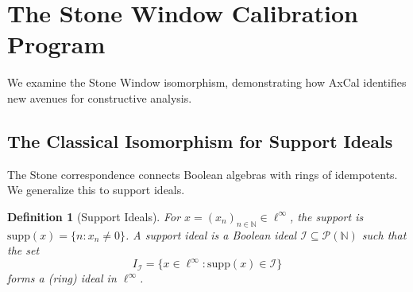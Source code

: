 \documentclass[11pt]{article}
\newtheorem{definition}[theorem]{Definition}
\newcommand{\N}{\mathbb{N}}
\newcommand{\linf}{\ell^\infty}
\newcommand{\supp}{\mathrm{supp}}
\begin{document}
\section{The Stone Window Calibration Program}

We examine the Stone Window isomorphism, demonstrating how AxCal identifies new avenues for constructive analysis.

\subsection{The Classical Isomorphism for Support Ideals}

The Stone correspondence connects Boolean algebras with rings of idempotents. We generalize this to support ideals.

\begin{definition}[Support Ideals]
For $x = (x_n)_{n \in \N} \in \linf$, the \emph{support} is $\supp(x) = \{n : x_n \neq 0\}$. A \emph{support ideal} is a Boolean ideal $\mathcal{I} \subseteq \mathcal{P}(\N)$ such that the set
\[
I_{\mathcal{I}} = \{x \in \linf : \supp(x) \in \mathcal{I}\}
\]
forms a (ring) ideal in $\linf$.
\end{definition}
\end{document}
